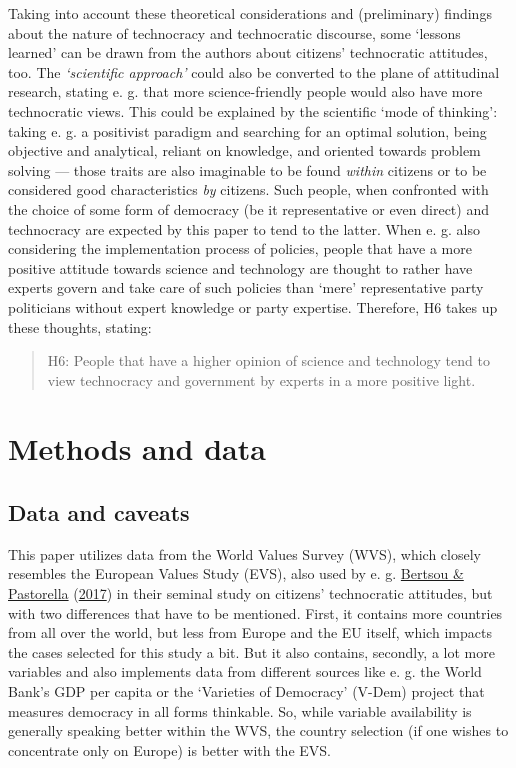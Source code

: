 \documentclass[
  12pt,
  english,
]{article}
\begin{document}
Taking into account these theoretical considerations and (preliminary)
findings about the nature of technocracy and technocratic discourse,
some `lessons learned' can be drawn from the authors about citizens'
technocratic attitudes, too. The \emph{`scientific approach'} could also
be converted to the plane of attitudinal research, stating e. g. that
more science-friendly people would also have more technocratic views.
This could be explained by the scientific `mode of thinking': taking e.
g. a positivist paradigm and searching for an optimal solution, being
objective and analytical, reliant on knowledge, and oriented towards
problem solving --- those traits are also imaginable to be found
\emph{within} citizens or to be considered good characteristics
\emph{by} citizens. Such people, when confronted with the choice of some
form of democracy (be it representative or even direct) and technocracy
are expected by this paper to tend to the latter. When e. g. also
considering the implementation process of policies, people that have a
more positive attitude towards science and technology are thought to
rather have experts govern and take care of such policies than `mere'
representative party politicians without expert knowledge or party
expertise. Therefore, H6 takes up these thoughts, stating:

\begin{quote}
H6: People that have a higher opinion of science and technology tend to
view technocracy and government by experts in a more positive light.
\end{quote}

\hypertarget{methods-and-data}{%
\section{Methods and data}\label{methods-and-data}}

\hypertarget{data-and-caveats}{%
\subsection{Data and caveats}\label{data-and-caveats}}

This paper utilizes data from the World Values Survey (WVS), which
closely resembles the European Values Study (EVS), also used by e. g.
\protect\hyperlink{ref-bertsou2017technocratic}{Bertsou \& Pastorella}
(\protect\hyperlink{ref-bertsou2017technocratic}{2017}) in their seminal
study on citizens' technocratic attitudes, but with two differences that
have to be mentioned. First, it contains more countries from all over
the world, but less from Europe and the EU itself, which impacts the
cases selected for this study a bit. But it also contains, secondly, a
lot more variables and also implements data from different sources like
e. g. the World Bank's GDP per capita or the `Varieties of Democracy'
(V-Dem) project that measures democracy in all forms thinkable. So,
while variable availability is generally speaking better within the WVS,
the country selection (if one wishes to concentrate only on Europe) is
better with the EVS.
\end{document}
